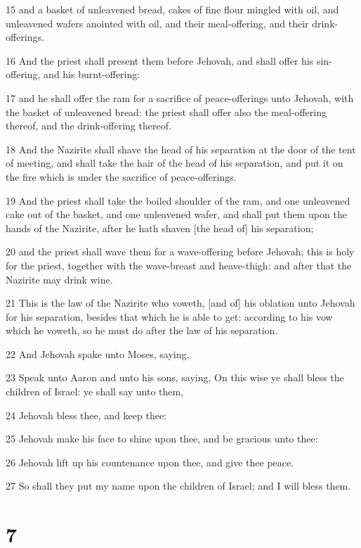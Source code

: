 \par 15 and a basket of unleavened bread, cakes of fine flour mingled with oil, and unleavened wafers anointed with oil, and their meal-offering, and their drink-offerings.
\par 16 And the priest shall present them before Jehovah, and shall offer his sin-offering, and his burnt-offering:
\par 17 and he shall offer the ram for a sacrifice of peace-offerings unto Jehovah, with the basket of unleavened bread: the priest shall offer also the meal-offering thereof, and the drink-offering thereof.
\par 18 And the Nazirite shall shave the head of his separation at the door of the tent of meeting, and shall take the hair of the head of his separation, and put it on the fire which is under the sacrifice of peace-offerings.
\par 19 And the priest shall take the boiled shoulder of the ram, and one unleavened cake out of the basket, and one unleavened wafer, and shall put them upon the hands of the Nazirite, after he hath shaven [the head of] his separation;
\par 20 and the priest shall wave them for a wave-offering before Jehovah; this is holy for the priest, together with the wave-breast and heave-thigh: and after that the Nazirite may drink wine.
\par 21 This is the law of the Nazirite who voweth, [and of] his oblation unto Jehovah for his separation, besides that which he is able to get: according to his vow which he voweth, so he must do after the law of his separation.
\par 22 And Jehovah spake unto Moses, saying,
\par 23 Speak unto Aaron and unto his sons, saying, On this wise ye shall bless the children of Israel: ye shall say unto them,
\par 24 Jehovah bless thee, and keep thee:
\par 25 Jehovah make his face to shine upon thee, and be gracious unto thee:
\par 26 Jehovah lift up his countenance upon thee, and give thee peace.
\par 27 So shall they put my name upon the children of Israel; and I will bless them.

\chapter{7}

